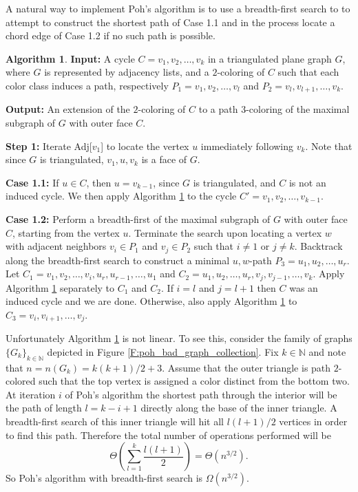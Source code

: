 \documentclass[12pt,letterpaper]{article}
\theoremstyle{plain}
\theoremstyle{definition}
\theoremstyle{break}
\newtheorem{algorithm}[lemma]{Algorithm}     %
\begin{document}
A natural way to implement Poh's algorithm is to use a breadth-first search to
to attempt to construct the shortest path of Case 1.1 and in the process locate
a chord edge of Case 1.2 if no such path is possible.

\begin{algorithm}\label{A:poh_bfs}
\textbf{Input:} A cycle $C=v_1,v_2,\ldots,v_k$ in a triangulated plane
graph $G$, where $G$ is represented by adjacency lists, and a $2$-coloring of $C$ such
that each color class induces a path, respectively $P_1=v_1,v_2,\ldots,v_l$ and
$P_2=v_l,v_{l+1},\ldots,v_k$.

\noindent\textbf{Output:} An extension of the $2$-coloring of $C$ to a path
$3$-coloring of the maximal subgraph of $G$ with outer face $C$.

\noindent\textbf{Step 1:} Iterate Adj[$v_1$] to locate the vertex $u$
immediately following $v_k$. Note that since $G$ is triangulated, $v_1,u,v_k$ is
a face of $G$.

\noindent\textbf{Case 1.1:} If $u\in C$, then $u=v_{k-1}$, since $G$ is
triangulated, and $C$ is not an induced cycle. We then
apply Algorithm \ref{A:poh_bfs} to the cycle $C'=v_1,v_2,\ldots,v_{k-1}$.

\noindent\textbf{Case 1.2:} Perform a breadth-first of the maximal subgraph of
$G$ with outer face $C$, starting from the
vertex $u$. Terminate the search upon locating a vertex $w$ with adjacent
neighbors $v_i\in P_1$ and $v_j\in P_2$ such that $i\ne 1$ or $j\ne k$.
Backtrack along the breadth-first search
to construct a minimal $u,w$-path $P_3=u_1,u_2,\ldots,u_r$. Let
$C_1=v_1,v_2,\ldots,v_i,u_r,u_{r-1},\ldots,u_1$ and
$C_2=u_1,u_2,\ldots,u_r,v_j,v_{j-1},\ldots,v_k$. Apply Algorithm \ref{A:poh_bfs}
separately to $C_1$ and $C_2$. If $i=l$ and $j={l+1}$ then $C$ was an induced
cycle and we are done. Otherwise, also apply Algorithm \ref{A:poh_bfs} to
$C_3=v_i,v_{i+1},\ldots,v_j$.
\end{algorithm}

Unfortunately Algorithm \ref{A:poh_bfs}
is not linear. To see this, consider the family of
graphs $\{G_k\}_{k\in\mathbb{N}}$ depicted in
Figure \ref{F:poh_bad_graph_collection}. Fix $k\in\mathbb{N}$ and note that
$n=n(G_k)=k(k+1)/2+3$. Assume
that the outer triangle is path $2$-colored such that the top vertex is
assigned a color distinct from the bottom two. At iteration $i$ of Poh's
algorithm the shortest path through the interior will be the path of length
$l=k-i+1$ directly along the base of the inner triangle. A breadth-first search
of this inner triangle will hit all $l(l+1)/2$ vertices in order to find this
path. Therefore the total number of operations performed will be
\[
    \Theta\left( \sum_{l=1}^k\frac{l(l+1)}{2} \right)=\Theta(n^{3/2}).
\]
So Poh's algorithm with breadth-first search is $\Omega(n^{3/2})$.
\end{document}

